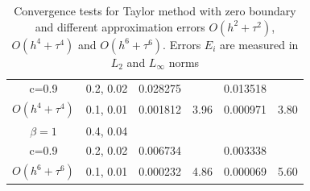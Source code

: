 \documentclass{beamer}
\begin{document}
\begin{frame}
\begin{table}[ht]
{\begin{tabular}{||c|l|ll|ll||}
       c=0.9                     &0.2, 0.02     & 0.028275   &        &  0.013518   &   \\
       $O(h^4+ \tau^4)$ &0.1, 0.01   &0.001812 & 3.96  & 0.000971  & 3.80  \\
    \hline
  $\beta=1$     &0.4, 0.04   &            &          &                  &      \\
      c=0.9                    &0.2, 0.02   &0.006734 &           & 0.003338      &       \\
     $O(h^6+ \tau^6)$ &0.1, 0.01 & 0.000232 &4.86 & 0.000069  & 5.60        \\
	   \hline
			\hline 
		\end{tabular}
		}%
		\caption{Convergence tests for Taylor method with zero boundary and different approximation errors $O(h^{2} + \tau^2 )$, $O(h^{4} + \tau^4 )$ and $O(h^{6} + \tau^6 )$. Errors $E_i$ are measured in $L_2$ and $L_\infty$ norms}
\label{table:A}
\end{table}

\end{frame}
\end{document}
